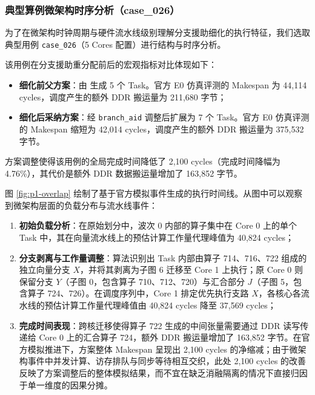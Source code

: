 \documentclass[anonymous,withtoc]{gmcm2026}
\providecommand{\tightlist}{\setlength{\itemsep}{0pt}\setlength{\parskip}{0pt}}
\begin{document}
\subsubsection{典型算例微架构时序分析（case\_026）}

为了在微架构时钟周期与硬件流水线级别理解分支援助细化的执行特征，我们选取典型用例 \texttt{case\_026}（5 Cores 配置）进行结构与时序分析。

该用例在分支援助重分配前后的宏观指标对比体现如下：

\begin{itemize}
\tightlist
\item
  \textbf{细化前父方案}：由 \texttt{} 生成 5 个 Task。官方 E0 仿真评测的 Makespan 为 44,114 cycles，调度产生的额外 DDR 搬运量为 211,680 字节；
\item
  \textbf{细化后采纳方案}：经 \texttt{branch\_aid} 调整后扩展为 7 个 Task。官方 E0 仿真评测的 Makespan 缩短为 42,014 cycles，调度产生的额外 DDR 搬运量为 375,532 字节。
\end{itemize}

方案调整使得该用例的全局完成时间降低了 2,100 cycles（完成时间降幅为 4.76\%），其代价是额外 DDR 数据搬运量增加了 163,852 字节。

图 \ref{fig:p1-overlap} 绘制了基于官方模拟事件生成的执行时间线。从图中可以观察到微架构层面的负载分布与流水线事件：

\begin{enumerate}
\def\labelenumi{\arabic{enumi}.}
\tightlist
\item
  \textbf{初始负载分析}：在原始划分中，波次 0 内部的算子集中在 Core 0 上的单个 Task 中，其在向量流水线上的预估计算工作量代理峰值为 40,824 cycles；
\item
  \textbf{分支剥离与工作量调整}：算法识别出 Task 内部由算子 714、716、722 组成的独立向量分支 \(X\)，并将其剥离为子图 6 迁移至 Core 1 上执行；原 Core 0 则保留分支 \(Y\)（子图 0，包含算子 710、712、720）与汇合部分 \(J\)（子图 5，包含算子 724、726）。在调度序列中，Core 1 排定优先执行支路 \(X\)，各核心各流水线的预估计算工作量代理峰值由 40,824 cycles 降至 37,569 cycles；
\item
  \textbf{完成时间表现}：跨核迁移使得算子 722 生成的中间张量需要通过 DDR 读写传递给 Core 0 上的汇合算子 724，额外 DDR 搬运量增加了 163,852 字节。在官方模拟推进下，方案整体 Makespan 呈现出 2,100 cycles 的净缩减；由于微架构事件中并发计算、访存排队与同步等待相互交织，此处 2,100 cycles 的改善反映了方案调整后的整体模拟结果，而不宜在缺乏消融隔离的情况下直接归因于单一维度的因果分摊。
\end{enumerate}
\end{document}
